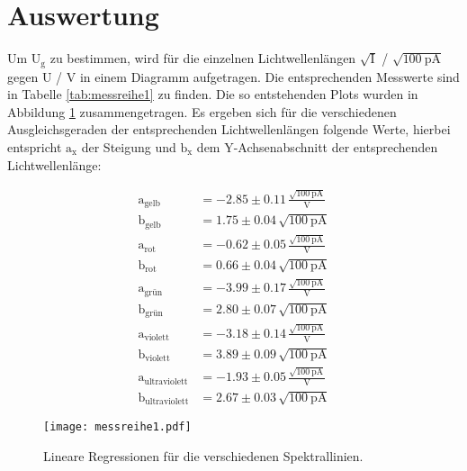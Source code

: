 \section{Auswertung}
\label{sec:Auswertung}
Um $\text{U}_\text{g}$ zu bestimmen, wird für die einzelnen Lichtwellenlängen $\sqrt{\text{I}}$ / $\sqrt{\SI{100}{\pico\ampere}}$ gegen $\text{U}$ / $\si{\volt}$ in einem Diagramm aufgetragen.
Die entsprechenden Messwerte sind in Tabelle \ref{tab:messreihe1} zu finden.
Die so entstehenden Plots wurden in Abbildung \ref{fig:messreihe1} zusammengetragen.
Es ergeben sich für die verschiedenen Ausgleichsgeraden der entsprechenden Lichtwellenlängen folgende Werte, hierbei entspricht $\text{a}_\text{x}$ der Steigung und $\text{b}_\text{x}$ dem Y-Achsenabschnitt der entsprechenden Lichtwellenlänge:

\begin{align*}
  \text{a}_\text{gelb} &= -2.85 \pm 0.11    \,\frac{\sqrt{\SI{100}{\pico\ampere}}}{\si{\volt}}   \\
  \text{b}_\text{gelb} &= 1.75 \pm 0.04     \,\sqrt{\SI{100}{\pico\ampere}}  \\
  \text{a}_\text{rot} &= -0.62 \pm 0.05    \,\frac{\sqrt{\SI{100}{\pico\ampere}}}{\si{\volt}}        \\
  \text{b}_\text{rot} &= 0.66 \pm 0.04       \,\sqrt{\SI{100}{\pico\ampere}}      \\
  \text{a}_\text{grün} &= -3.99 \pm 0.17    \,\frac{\sqrt{\SI{100}{\pico\ampere}}}{\si{\volt}}       \\
  \text{b}_\text{grün} &= 2.80 \pm 0.07        \,\sqrt{\SI{100}{\pico\ampere}}    \\
  \text{a}_\text{violett} &= -3.18 \pm 0.14     \,\frac{\sqrt{\SI{100}{\pico\ampere}}}{\si{\volt}}   \\
  \text{b}_\text{violett} &= 3.89 \pm 0.09       \,\sqrt{\SI{100}{\pico\ampere}}  \\
  \text{a}_\text{ultraviolett} &= -1.93 \pm 0.05   \,\frac{\sqrt{\SI{100}{\pico\ampere}}}{\si{\volt}}\\
  \text{b}_\text{ultraviolett} &= 2.67 \pm 0.03  \,\sqrt{\SI{100}{\pico\ampere}}
\end{align*}

\FloatBarrier
\begin{figure}
  \centering
  \texttt{[image: messreihe1.pdf]}
  \caption{Lineare Regressionen für die verschiedenen Spektrallinien.}
  \label{fig:messreihe1}
\end{figure}
\FloatBarrier


